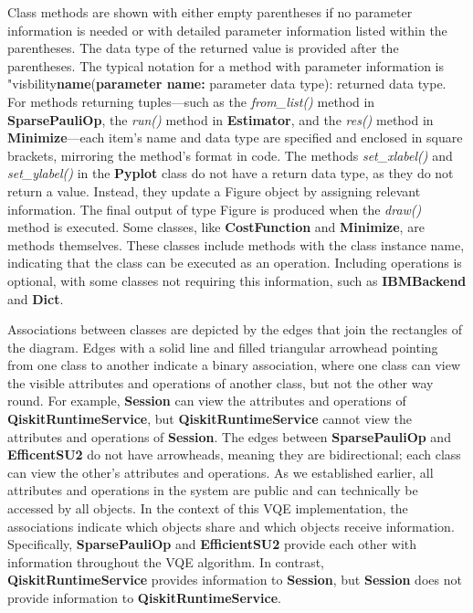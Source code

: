 \documentclass{article}
\begin{document}
Class methods are shown with either empty parentheses if no parameter information is needed or with detailed parameter information listed within the parentheses. The data type of the returned value is provided after the parentheses. The typical notation for a method with parameter information is "visbility\textbf{name}(\textbf{parameter name:} parameter data type): returned data type. For methods returning tuples—such as the \textit{from\_list()} method in \textbf{SparsePauliOp}, the \textit{run()} method in \textbf{Estimator}, and the \textit{res()} method in \textbf{Minimize}—each item's name and data type are specified and enclosed in square brackets, mirroring the method's format in code. 
The methods \textit{set\_xlabel()} and \textit{set\_ylabel()} in the \textbf{Pyplot} class do not have a return data type, as they do not return a value\cite{xlabel}\cite{ylabel}. Instead, they update a Figure object by assigning relevant information. The final output of type Figure is produced when the \textit{draw()} method is executed. 
Some classes, like \textbf{CostFunction} and \textbf{Minimize}, are methods themselves. These classes include methods with the class instance name, indicating that the class can be executed as an operation. Including operations is optional, with some classes not requiring this information, such as \textbf{IBMBackend} and \textbf{Dict}. 

Associations between classes are depicted by the edges that join the rectangles of the diagram. Edges with a solid line and filled triangular arrowhead pointing from one class to another indicate a binary association, where one class can view the visible attributes and operations of another class, but not the other way round\cite{Seidl_Scholz_Huemer_Kappel_Duffy_2014}. For example, \textbf{Session} can view the attributes and operations of \textbf{QiskitRuntimeService}, but \textbf{QiskitRuntimeService} cannot view the attributes and operations of \textbf{Session}. The edges between \textbf{SparsePauliOp} and \textbf{EfficentSU2} do not have arrowheads, meaning they are bidirectional; each class can view the other's attributes and operations\cite{Seidl_Scholz_Huemer_Kappel_Duffy_2014}. As we established earlier, all attributes and operations in the system are public and can technically be accessed by all objects. In the context of this VQE implementation, the associations indicate which objects share and which objects receive information. Specifically, \textbf{SparsePauliOp} and \textbf{EfficientSU2} provide each other with information throughout the VQE algorithm. In contrast, \textbf{QiskitRuntimeService} provides information to \textbf{Session}, but \textbf{Session} does not provide information to \textbf{QiskitRuntimeService}.
\end{document}
